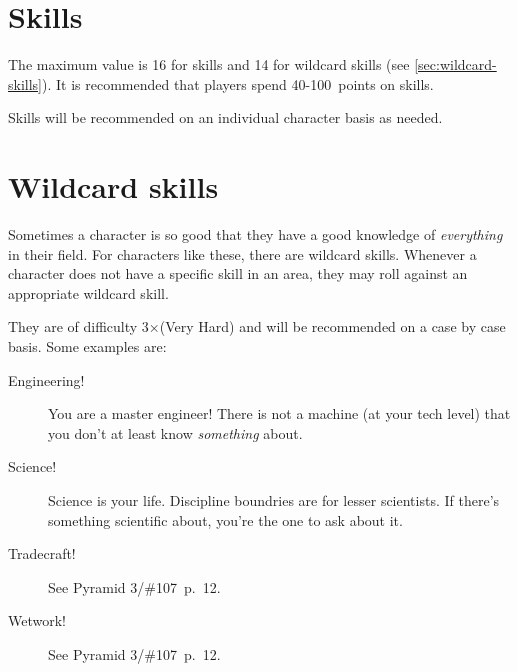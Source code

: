 \begin{traitlist}
   

\end{traitlist}

\section{Skills}
\label{sec:skills}

The maximum value is 16 for skills and 14 for wildcard skills (see
\autoref{sec:wildcard-skills}). It is recommended that players spend
40-100~points on skills.

Skills will be recommended on an individual character basis as needed.

\section{Wildcard skills}
\label{sec:wildcard-skills}

  Sometimes a character is so good that they have a good knowledge of
  \emph{everything} in their field. For characters like these, there are
  wildcard skills. Whenever a character does not have a specific skill in an
  area, they may roll against an appropriate wildcard skill.

  They are of difficulty 3×(Very Hard) and will be recommended on a case by case
  basis. Some examples are:
  \begin{description}
  \item[Engineering!] You are a master engineer! There is not a machine (at your
    tech level) that you don't at least know \emph{something} about.
  \item[Science!] Science is your life. Discipline boundries are for lesser
    scientists. If there's something scientific about, you're the one to ask
    about it.
  \item[Tradecraft!] See Pyramid 3/\#107~p.~12.
  \item[Wetwork!] See Pyramid 3/\#107~p.~12.
  \end{description}


